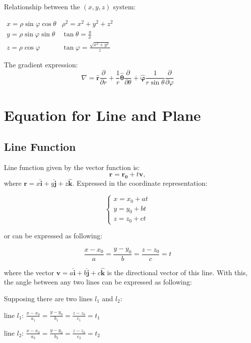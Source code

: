 \documentclass[UTF8,a4paper, 10pt, openany]{svmono}
\begin{document}
\begin{enumerate}
Relationship between the $(x, y, z)$ system:
\begin{center}
$\begin{array}{cc}
x = \rho \sin \varphi \cos \theta &  \rho ^2 = x^2+y^2+z^2\\
y = \rho \sin \varphi \sin \theta &  \tan \theta = \frac{y}{x}\\
z = \rho \cos \varphi  &  \tan \varphi = \frac{\sqrt{x^2+y^2}}{z}
\end{array}$
\end{center}

The gradient expression:
\begin{equation}
 \boxed{\nabla = \mathbf{\hat{r}}\frac{\partial }{\partial r} + \frac{1}{r}\bm{\hat{\theta}}\frac{\partial }{\partial \theta}+\bm{\hat{\varphi}}\frac{1}{r\sin \theta}\frac{\partial }{\partial \varphi}}
\end{equation}
\end{enumerate}




\section{Equation for Line and Plane}
\subsection{Line Function}
Line function given by the vector function is:
\[\mathbf{r}=\mathbf{r_0}+t\mathbf{v},\]
where $\mathbf{r}=x\mathbf{\hat{i}}+y\mathbf{\hat{j}}+z\mathbf{\hat{k}}$.
Expressed in the coordinate representation:

\[\begin{cases}
x=x_0+at \\
y=y_0+bt \\
z=z_0+ct
\end{cases}\]

or can be expressed as following:

\[\frac{x-x_0}{a}=\frac{y-y_0}{b}=\frac{z-z_0}{c}=t\]

where the vector $\mathbf{v}=a\mathbf{\hat{i}}+b\mathbf{\hat{j}}+c\mathbf{\hat{k}}$ is the directional vector of this line. With this, the angle between any two lines can be expressed as following:

Supposing there are two lines $l_1$ and $l_2$:

\begin{center}
line $l_1$: $\frac{x-x_0}{a_1}=\frac{y-y_0}{b_1}=\frac{z-z_0}{c_1}=t_1$

line $l_2$: $\frac{x-x_0}{a_2}=\frac{y-y_0}{b_2}=\frac{z-z_0}{c_2}=t_2$
\end{center}
\end{document}
